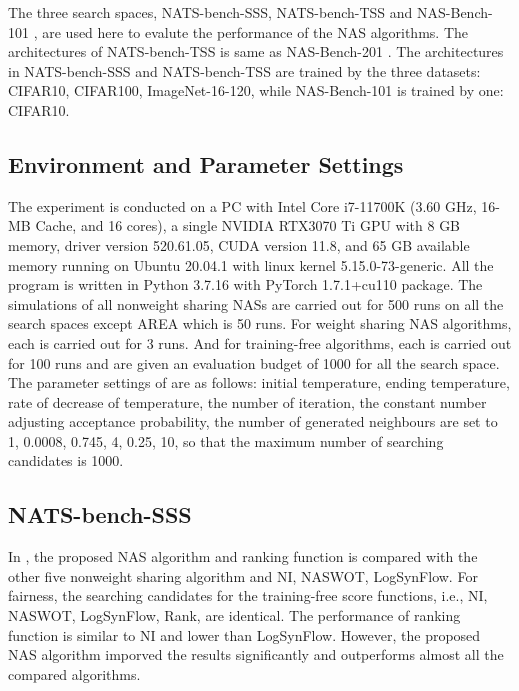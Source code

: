 \documentclass[sigconf]{acmart}
\begin{document}
    The three search spaces, NATS-bench-SSS, NATS-bench-TSS 
    \cite{Dong_2021} and NAS-Bench-101 \cite{ying2019nasbench101}, are used 
    here to evalute the performance of the NAS algorithms. The architectures 
    of NATS-bench-TSS is same as NAS-Bench-201 \cite{dong2020nasbench201}. 
    The architectures in NATS-bench-SSS and NATS-bench-TSS are trained by the three datasets: 
    CIFAR10, CIFAR100, ImageNet-16-120, while NAS-Bench-101 is trained by one: 
    CIFAR10. 

    \subsection{Environment and Parameter Settings}
    The experiment is conducted on a PC with Intel Core i7-11700K (3.60 GHz, 16-MB Cache, and 16 cores), 
    a single NVIDIA RTX3070 Ti GPU with 8 GB memory, driver version 520.61.05, CUDA version 11.8, and 
    65 GB available memory running on Ubuntu 20.04.1 with linux kernel 5.15.0-73-generic. All the program 
    is written in Python 3.7.16 with PyTorch 1.7.1+cu110 package. The simulations of all 
    nonweight sharing NASs are carried out for 500 runs on all the search spaces except AREA which is 50 runs. 
    For weight sharing NAS algorithms, each is carried out for 3 runs. And for training-free 
    algorithms, each is carried out for 100 runs and are given an evaluation 
    budget of 1000 for all the search space. The parameter settings of \palg are as follows: 
    initial temperature, ending temperature, rate of decrease of temperature, the number of iteration, 
    the constant number adjusting acceptance probability, the number of generated neighbours are set 
    to 1, 0.0008, 0.745, 4, 0.25, 10, so that the maximum number of searching candidates is 1000. 

    \subsection{NATS-bench-SSS}
    In , the proposed NAS algorithm and ranking function is 
    compared with the other five nonweight sharing algorithm and NI, NASWOT, LogSynFlow. 
    For fairness, the searching candidates for the training-free score functions, i.e., 
    NI, NASWOT, LogSynFlow, Rank, are identical. The performance of ranking function 
    is similar to NI and lower than LogSynFlow. However, the proposed NAS algorithm 
    imporved the results significantly and outperforms almost all the compared algorithms. 
\end{document}
